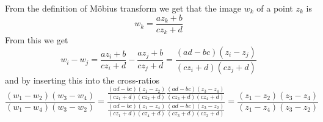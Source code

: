 \documentclass[12pt]{article}
\begin{document}
From the definition of M\"obius transform we get
that the image $w_k$ of a point $z_k$ is
$$
w_k = \frac{az_k+b}{cz_k+d}
$$
From this we get
$$
w_i - w_j = \frac{az_i+b}{cz_i+d} - \frac{az_j+b}{cz_j+d}
= \frac{(ad-bc)(z_i-z_j)}{(cz_i+d)(cz_j+d)}
$$
and by inserting this into the cross-ratios
$$
\frac{(w_1-w_2)(w_3-w_4)}{(w_1-w_4)(w_3-w_2)} =
\frac{\frac{(ad-bc)(z_1-z_2)}{(cz_1+d)(cz_2+d)}\frac{(ad-bc)(z_3-z_4)}{(cz_3+d)(cz_4+d)}}{\frac{(ad-bc)(z_1-z_4)}{(cz_1+d)(cz_4+d)}\frac{(ad-bc)(z_3-z_2)}{(cz_3+d)(cz_2+d)}} =  \frac{(z_1-z_2)(z_3-z_4)}{(z_1-z_4)(z_3-z_2)}
$$
\end{document}
